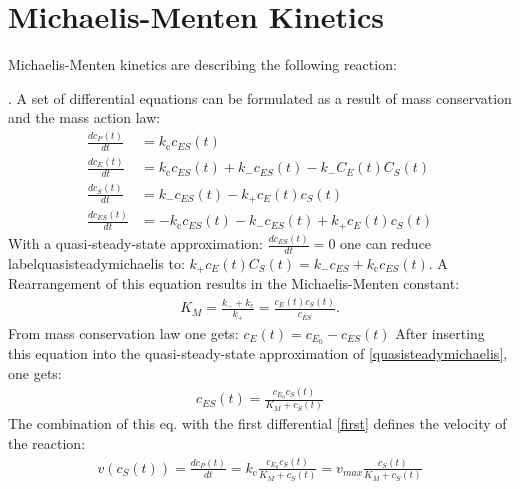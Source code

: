 \documentclass[
  a4paper,BCOR10mm,oneside,
  headsepline,footsepline,%
  fleqn,openbib
]{scrbook}
\begin{document}
\section{Michaelis-Menten Kinetics}\label{Menten_der}
Michaelis-Menten kinetics are describing the following reaction: \par
{}.
A set of differential equations can be formulated as a result of mass conservation and the mass action law:
\begin{align}
\frac{dc_P(t)}{dt} &= k_{\mathrm{c}} c_{ES}(t) \\ \label{first}
\frac{dc_E(t)}{dt} &= k_{\mathrm{c}} c_{ES}(t)+k_{\mathrm{-}} c_{ES}(t)-k_{\mathrm{-}} C_E(t) C_S(t)\\
\frac{dc_S(t)}{dt} &= k_{\mathrm{-}} c_{ES}(t)-k_{\mathrm{+}} c_E(t) c_S(t)\\
\frac{dc_{ES}(t)}{dt} &=  - k_{\mathrm{c}} c_{ES}(t) -k_{\mathrm{-}} c_{ES}(t)+k_{\mathrm{+}} c_E(t) c_S(t) \label{quasisteadymichaelis}
\end{align}
With a quasi-steady-state approximation: $\frac{dc_{ES}(t)}{dt}=0$ one can reduce label{quasisteadymichaelis} to: $ k_{\mathrm{+}}c_E(t) C_S(t)=k_{\mathrm{-}}c_{ES}+k_{\mathrm{c}}c_{ES}(t)$. A Rearrangement of this equation results in the Michaelis-Menten constant:
\begin{align}
 K_M=\frac{k_{\mathrm{-}}+k_{\mathrm{c}}}{k_{\mathrm{+}}}=\frac{c_E(t) c_S(t)}{c_{ES}}. 
\end{align}
From mass conservation law one gets: $c_E(t)=c_{E_0} -c_{ES}(t) $
After inserting this equation into the quasi-steady-state approximation of \cref{quasisteadymichaelis}, one gets:
\begin{align}
 c_{ES}(t)=\frac{c_{E_0} c_S(t)}{K_M+c_S(t)}
\end{align}
The combination of this eq. with the first differential \cref{first} defines the velocity of the reaction:
\begin{align}
 v(c_S(t))= \frac{dc_P(t)}{dt}= k_{\mathrm{c}} \frac{c_{E_0} c_S(t)}{K_M+c_S(t)} = v_{max} \frac{c_S(t)}{K_M+c_S(t)}  
\end{align}
\end{document}
